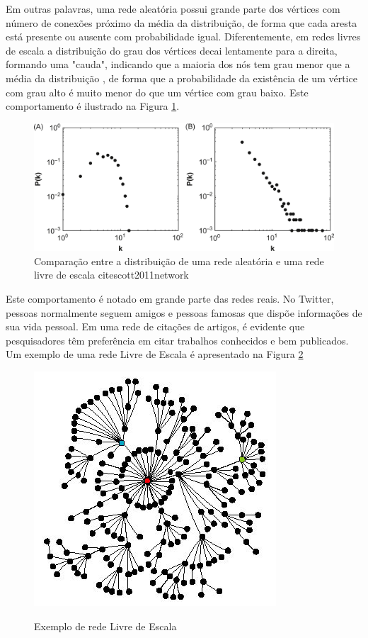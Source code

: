 Em outras palavras, uma rede aleatória possui grande parte dos vértices com número de conexões próximo da média da distribuição, de forma que cada aresta está presente ou ausente com probabilidade igual. Diferentemente, em redes livres de escala a distribuição do grau dos vértices decai lentamente para a direita, formando uma "cauda", indicando que a maioria dos nós tem grau menor que a média da distribuição \cite{watts2004new}, de forma que a probabilidade da existência de um vértice com grau alto é muito menor do que um vértice com grau baixo. Este comportamento é ilustrado na Figura \ref{comp_distr}.

\begin{figure}[!htb]
\centering
\includegraphics[scale=0.15]{./imagens/comparisson.png}
\caption{Comparação entre a distribuição de uma rede aleatória e uma rede livre de escala cite{scott2011network}}
\label{comp_distr}
\end{figure}

Este comportamento é notado em grande parte das redes reais. No Twitter, pessoas normalmente seguem amigos e pessoas famosas que dispõe informações de sua vida pessoal. Em uma rede de citações de artigos, é evidente que pesquisadores têm preferência em citar trabalhos conhecidos e bem publicados. Um exemplo de uma rede Livre de Escala é apresentado na Figura \ref{graph_scale}

\begin{figure}[!htb]
\centering
\includegraphics[scale=0.8]{./imagens/scale_free.png}
\caption{Exemplo de rede Livre de Escala} \cite{strogatz2001exploring}
\label{graph_scale}
\end{figure}

